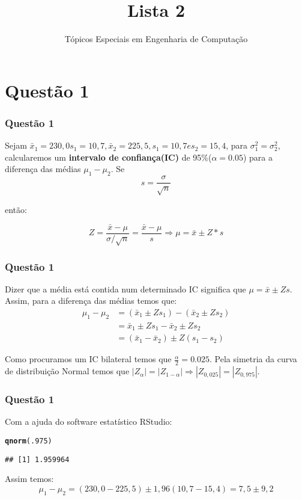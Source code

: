 \documentclass{beamer}\usepackage[]{graphicx}\usepackage[]{color}
\makeatletter
\newcommand{\hlnum}[1]{\textcolor[rgb]{0.686,0.059,0.569}{#1}}%
\newcommand{\hlstd}[1]{\textcolor[rgb]{0.345,0.345,0.345}{#1}}%
\newcommand{\hlkwd}[1]{\textcolor[rgb]{0.737,0.353,0.396}{\textbf{#1}}}%
\newenvironment{kframe}{%
 \def\at@end@of@kframe{}%
 \ifinner\ifhmode%
  \def\at@end@of@kframe{\end{minipage}}%
  \begin{minipage}{\columnwidth}%
 \fi\fi%
 \def\FrameCommand##1{\hskip\@totalleftmargin \hskip-\fboxsep
 \colorbox{shadecolor}{##1}\hskip-\fboxsep
     \hskip-\linewidth \hskip-\@totalleftmargin \hskip\columnwidth}%
 \MakeFramed {\advance\hsize-\width
   \@totalleftmargin\z@ \linewidth\hsize
   \@setminipage}}%
 {\par\unskip\endMakeFramed%
 \at@end@of@kframe}
\newenvironment{knitrout}{}{} %
\makeatother
\begin{document}
	\title{Lista 2}
	\subtitle{Tópicos Especiais em Engenharia de Computação}
	
	\begin{frame}[plain]
		\maketitle
	\end{frame}
	
	\section{Questão 1}
		\begin{frame}
			\frametitle{Questão 1}
			Sejam $\bar{x}_{1} = 230,0 s_{1} = 10,7, \bar{x}_{2} = 225,5, s_{1} = 10,7 e s_{2} = 15,4$, para $\sigma_{1}^{2} = \sigma_{2}^{2}$, calcularemos um \textbf{intervalo de confiança(IC)} de 95\%($\alpha = 0.05$) para a diferença das médias $\mu_{1} - \mu_{2}$.  Se $$s = \frac{\sigma}{\sqrt{n}}$$
			
			então:
			
			$$Z = \frac{\bar{x} - \mu}{\sigma/\sqrt{n}} = \frac{\bar{x} - \mu}{s} \Rightarrow \mu = \bar{x} \pm Z*s$$
		\end{frame}
		\begin{frame}
			\frametitle{Questão 1}
			Dizer que a média está contida num determinado IC significa que $\mu = \bar{x} \pm Zs$.  Assim, para a diferença das médias temos que:
				\begin{align*}
					\mu_{1} - \mu_{2} &= (\bar{x}_{1} \pm Zs_{1}) - (\bar{x}_{2} \pm Zs_{2})\\
					&= \bar{x}_{1} \pm  Zs_{1} - \bar{x}_{2} \pm Zs_{2}\\
					&= (\bar{x}_{1} - \bar{x}_{2}) \pm Z(s_{1} - s_{2})
				\end{align*}
				
				Como procuramos um IC bilateral temos que $\frac{\alpha}{2} = 0.025$.  Pela simetria da curva de distribuição Normal temos que $|Z_{\alpha}| = |Z_{1-\alpha}| \Rightarrow |Z_{0,025}| = |Z_{0,975}|$.  
                \end{frame}
                
                \begin{frame}[fragile]
                        \frametitle{Questão 1}
                        Com a ajuda do software estatístico RStudio:
\begin{knitrout}
\color{fgcolor}\begin{kframe}
\begin{alltt}
\hlkwd{qnorm}\hlstd{(}\hlnum{.975}\hlstd{)}
\end{alltt}
\begin{verbatim}
## [1] 1.959964
\end{verbatim}
\end{kframe}
\end{knitrout}
                        Assim temos:
                        $$\mu_{1} - \mu_{2} = (230,0 - 225,5)\pm1,96(10,7-15,4) = 7,5\pm9,2$$

                \end{frame}
                
\end{document}
